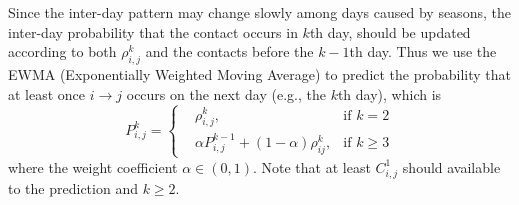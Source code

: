 Since the inter-day pattern may change slowly among days caused by seasons,
the inter-day probability that the contact occurs in $k$th day,
should be updated according to both $\rho^{k}_{i,j}$
and the contacts before the $k-1$th day.
Thus we use the EWMA (Exponentially Weighted Moving Average) to
predict the probability that at least once $i \rightarrow j$
occurs on the next day (e.g., the $k$th day), which is
\begin{equation}
\label{eq:P}
P^{k}_{i,j} =
\left\{
\begin{aligned}
& \rho^{k}_{i,j}, &\text{if  } k = 2 \\
& \alpha P^{k-1}_{i,j} + (1-\alpha) \rho^{k}_{i j}, &\text{if  } k \ge 3
\end{aligned}
\right.
\end{equation}
where the weight coefficient $\alpha \in (0, 1)$.
Note that at least $C^{1}_{i,j}$ should available to the prediction
and $k \ge 2$.

